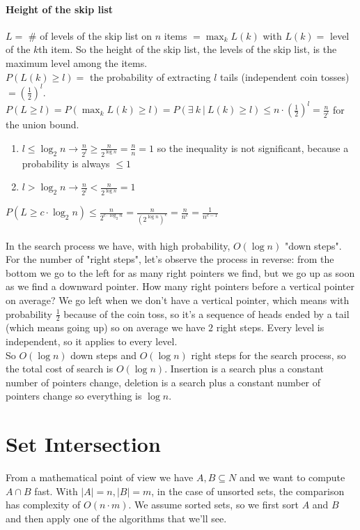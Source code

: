 \documentclass[10pt]{report}
\begin{document}
\paragraph{Height of the skip list} $L =$ \# of levels of the skip list on $n$ items $= \max_k L(k)$ with $L(k) =$ level of the $k$th item. So the height of the skip list, the levels of the skip list, is the maximum level among the items.\\
$P(L(k) \geq l) = $ the probability of extracting $l$ tails (independent coin tosses) $= \left(\frac{1}{2}\right)^l$.\\
$P(L \geq l) = P(\max_k L(k) \geq l) = P(\exists\: k\:|\: L(k) \geq l) \leq n\cdot\left(\frac{1}{2}\right)^l = \frac{n}{2^l}$ for the union bound.
\begin{enumerate}
	\item $l \leq \log_2 n \rightarrow \frac{n}{2^l} \geq \frac{n}{2^{\log n}} = \frac{n}{n} = 1$ so the inequality is not significant, because a probability is always $\leq 1$
	\item $l > \log_2 n \rightarrow \frac{n}{2^l} < \frac{n}{2^{\log n}} = 1$
\end{enumerate}
$P(L \geq c\cdot\log_2 n) \leq \frac{n}{2^{c\cdot\log_2 n}} = \frac{n}{(2^{\log n})^c} = \frac{n}{n^c} = \frac{1}{n^{c-1}}$\\\\
In the search process we have, with high probability, $O(\log n)$ "down steps". For the number of "right steps", let's observe the process in reverse: from the bottom we go to the left for as many right pointers we find, but we go up as soon as we find a downward pointer. How many right pointers before a vertical pointer on average? We go left when we don't have a vertical pointer, which means with probability $\frac{1}{2}$ because of the coin toss, so it's a sequence of heads ended by a tail (which means going up) so on average we have $2$ right steps. Every level is independent, so it applies to every level.\\
So $O(\log n)$ down steps and $O(\log n)$ right steps for the search process, so the total cost of search is $O(\log n)$. Insertion is a search plus a constant number of pointers change, deletion is a search plus a constant number of pointers change so everything is $\log n$.
\section{Set Intersection}
From a mathematical point of view we have $A,B\subseteq N$ and we want to compute $A \cap B$ fast. With $|A| = n, |B| = m$, in the case of unsorted sets, the comparison has complexity of $O(n\cdot m)$. We assume sorted sets, so we first sort $A$ and $B$ and then apply one of the algorithms that we'll see.
\end{document}
